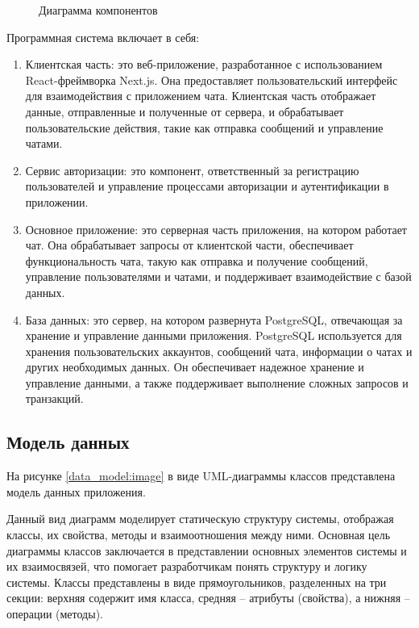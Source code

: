 \begin{figure}[H]
\caption{Диаграмма компонентов}
\label{components:image}
\end{figure}

Программная система включает в себя:
\begin{enumerate}
		\item Клиентская часть: это веб-приложение, разработанное с использованием React-фреймворка Next.js. Она предоставляет пользовательский интерфейс для взаимодействия с приложением чата. Клиентская часть отображает данные, отправленные и полученные от сервера, и обрабатывает пользовательские действия, такие как отправка сообщений и управление чатами.
			
		\item Сервис авторизации: это компонент, ответственный за регистрацию пользователей и управление процессами авторизации и аутентификации в приложении. 
		
		\item Основное приложение: это серверная часть приложения, на котором работает чат. Она обрабатывает запросы от клиентской части, обеспечивает функциональность чата, такую как отправка и получение сообщений, управление пользователями и чатами, и поддерживает взаимодействие с базой данных.
		
		\item База данных: это сервер, на котором развернута PostgreSQL, отвечающая за хранение и управление данными приложения. PostgreSQL используется для хранения пользовательских аккаунтов, сообщений чата, информации о чатах и других необходимых данных. Он обеспечивает надежное хранение и управление данными, а также поддерживает выполнение сложных запросов и транзакций\cite{db}.
\end{enumerate}

\subsection{Модель данных}

На рисунке \ref{data_model:image} в виде UML-диаграммы классов представлена модель данных приложения.

Данный вид диаграмм моделирует статическую структуру системы, отображая классы, их свойства, методы и взаимоотношения между ними. Основная цель диаграммы классов заключается в представлении основных элементов системы и их взаимосвязей, что помогает разработчикам понять структуру и логику системы. Классы представлены в виде прямоугольников, разделенных на три секции: верхняя содержит имя класса, средняя – атрибуты (свойства), а нижняя – операции (методы).

